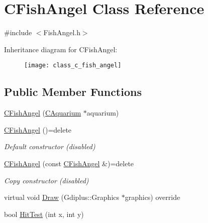 \hypertarget{class_c_fish_angel}{}\section{C\+Fish\+Angel Class Reference}
\label{class_c_fish_angel}


{\ttfamily \#include $<$Fish\+Angel.\+h$>$}

Inheritance diagram for C\+Fish\+Angel\+:\begin{figure}[H]
\begin{center}
\leavevmode
\texttt{[image: class\_c\_fish\_angel]}
\end{center}
\end{figure}
\subsection*{Public Member Functions}
\begin{DoxyCompactItemize}
\item 
\mbox{\hyperlink{class_c_fish_angel_a05e4f975732625fbe4fc898c3ba2adf1}{C\+Fish\+Angel}} (\mbox{\hyperlink{class_c_aquarium}{C\+Aquarium}} $\ast$aquarium)
\item 
\mbox{\label{class_c_fish_angel_a7fedfa1e7490da7eb24359dfaca397dc}} 
\mbox{\hyperlink{class_c_fish_angel_a7fedfa1e7490da7eb24359dfaca397dc}{C\+Fish\+Angel}} ()=delete
\begin{DoxyCompactList}\small\item\em Default constructor (disabled) \end{DoxyCompactList}\item 
\mbox{\label{class_c_fish_angel_aa8a0b4f7e203fa5daa3df207d7d56059}} 
\mbox{\hyperlink{class_c_fish_angel_aa8a0b4f7e203fa5daa3df207d7d56059}{C\+Fish\+Angel}} (const \mbox{\hyperlink{class_c_fish_angel}{C\+Fish\+Angel}} \&)=delete
\begin{DoxyCompactList}\small\item\em Copy constructor (disabled) \end{DoxyCompactList}\item 
virtual void \mbox{\hyperlink{class_c_fish_angel_a242095541dc288d73ca583b61bc8f417}{Draw}} (Gdiplus\+::\+Graphics $\ast$graphics) override
\item 
bool \mbox{\hyperlink{class_c_fish_angel_a7bc5bf0fbb87b728e4ed0ef8da8a5841}{Hit\+Test}} (int x, int y)
\end{DoxyCompactItemize}
